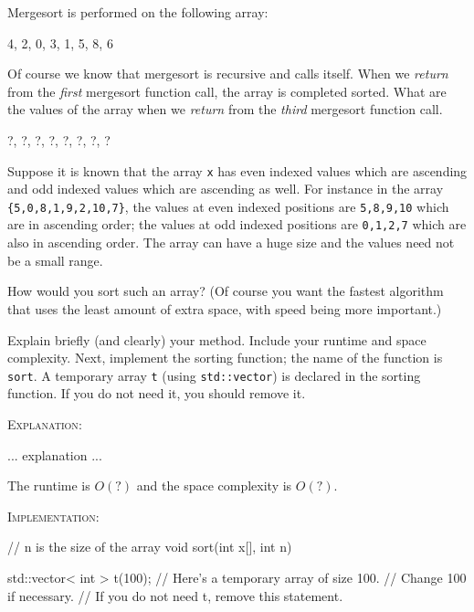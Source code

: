 \newpage
\nextq
Mergesort is performed on the following
array:
\begin{console}
{4, 2, 0, 3, 1, 5, 8, 6}
\end{console}

Of course we know that mergesort is recursive and calls itself.
When we \textit{return} from the \textit{first} mergesort function call,
the array is completed sorted.
What are the values of the array when we \textit{return} from the \textit{third}
mergesort function call.

\ANSWER
\begin{answercode}
{?, ?, ?, ?, ?, ?, ?, ?}
\end{answercode}

\newpage
\nextq
Suppose it is known that the array \verb!x! has even indexed values which are
ascending and odd indexed values which are ascending as well.
For instance in the array \verb!{5,0,8,1,9,2,10,7}!,
the values at even indexed positions are
\verb!5,8,9,10! which are in ascending order;
the values at odd indexed positions are
\verb!0,1,2,7! which are also in ascending order.
The array can have a huge size and the values need not be a small range.

How would you sort such an array?
(Of course you want the fastest algorithm that uses the least amount
of extra space, with speed being more important.)

Explain briefly (and clearly) your method.
Include your runtime and space complexity.
Next, implement the sorting function; the name of the function is \verb!sort!.
A temporary array \verb!t! (using \verb!std::vector!) is declared in the sorting
function.
If you do not need it, you should remove it.

\ANSWER

\textsc{Explanation}:
\begin{answerlong}

... explanation ...

The runtime is $O(?)$ and the space complexity is $O(?)$.
\end{answerlong}  

\textsc{Implementation}:
\begin{answercode} 
// n is the size of the array
void sort(int x[], int n)
{
    std::vector< int > t(100); // Here's a temporary array of size 100.
                               // Change 100 if necessary.
                               // If you do not need t, remove this statement.

} 
\end{answercode}

\newpage



